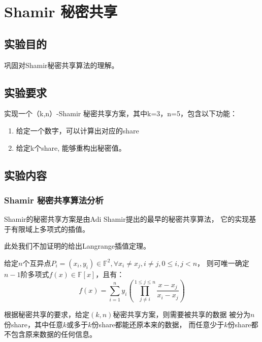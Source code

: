 \chapter{Shamir 秘密共享}

\section{实验目的}

巩固对Shamir秘密共享算法的理解。

\section{实验要求}

实现一个（k,n）-Shamir 秘密共享方案，其中k=3，n=5，包含以下功能：
\begin{enumerate}
    \item 给定一个数字，可以计算出对应的share
    \item 给定k个share, 能够重构出秘密值。
\end{enumerate}

\section{实验内容}

\subsection{Shamir 秘密共享算法分析}

Shamir的秘密共享方案是由Adi Shamir提出的最早的秘密共享算法，
它的实现基于有限域上多项式的插值\cite{contributors_2019}。

此处我们不加证明的给出Langrange插值定理。

\begin{theorem}
    \label{the:lang}
    给定$n$个互异点$P_i=(x_i,y_i)\in \mathbb{F}^2,\forall x_i \neq x_j, i \neq j,0\leq i,j < n$，
    则可唯一确定$n-1$阶多项式$f(x)\in \mathbb{F}[x]$，且有：
    \begin{equation*}
        f(x) = \sum_{i=1}^{n} y_i \left(
            \prod_{j\neq i}^{1\leq j \leq n}\frac{x-x_j}{x_i-x_j}
        \right)
    \end{equation*}
\end{theorem}

根据秘密共享的要求，给定$(k,n)$秘密共享方案，则需要被共享的数据
被分为$n$份share，其中任意$k$或多于$k$份share都能还原本来的数据，
而任意少于$k$份share都不包含原来数据的任何信息。

